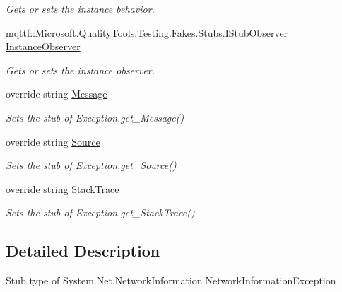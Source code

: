\begin{DoxyCompactItemize}
\begin{DoxyCompactList}\small\item\em Gets or sets the instance behavior.\end{DoxyCompactList}\item 
mqttf\-::\-Microsoft.\-Quality\-Tools.\-Testing.\-Fakes.\-Stubs.\-I\-Stub\-Observer \hyperlink{class_system_1_1_net_1_1_network_information_1_1_fakes_1_1_stub_network_information_exception_a1853ff4b7452f9b5a8a7dc836fd90e1c}{Instance\-Observer}
\begin{DoxyCompactList}\small\item\em Gets or sets the instance observer.\end{DoxyCompactList}\item 
override string \hyperlink{class_system_1_1_net_1_1_network_information_1_1_fakes_1_1_stub_network_information_exception_aaf578a9b9c2a40ce0f5f76dfb877f0a2}{Message}
\begin{DoxyCompactList}\small\item\em Sets the stub of Exception.\-get\-\_\-\-Message()\end{DoxyCompactList}\item 
override string \hyperlink{class_system_1_1_net_1_1_network_information_1_1_fakes_1_1_stub_network_information_exception_a8722dd8a1a22e9705f876c28a704ae56}{Source}
\begin{DoxyCompactList}\small\item\em Sets the stub of Exception.\-get\-\_\-\-Source()\end{DoxyCompactList}\item 
override string \hyperlink{class_system_1_1_net_1_1_network_information_1_1_fakes_1_1_stub_network_information_exception_a87a5d3f144018f659a1d517f28897705}{Stack\-Trace}
\begin{DoxyCompactList}\small\item\em Sets the stub of Exception.\-get\-\_\-\-Stack\-Trace()\end{DoxyCompactList}\end{DoxyCompactItemize}


\subsection{Detailed Description}
Stub type of System.\-Net.\-Network\-Information.\-Network\-Information\-Exception



